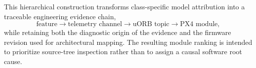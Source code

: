 This hierarchical construction transforms class-specific model attribution into a traceable engineering evidence chain,
\begin{equation}
\text{feature}
\rightarrow
\text{telemetry channel}
\rightarrow
\text{uORB topic}
\rightarrow
\text{PX4 module},
\label{eq:evidence_traceability_chain}
\end{equation}
while retaining both the diagnostic origin of the evidence and the firmware revision used for architectural mapping. The resulting module ranking is intended to prioritize source-tree inspection rather than to assign a causal software root cause.
